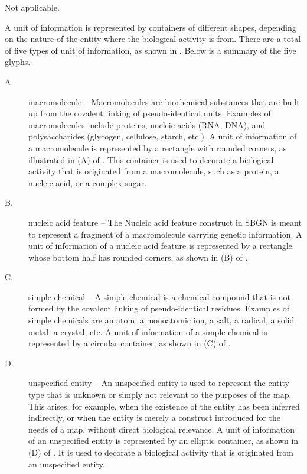 \begin{glyphDescription}

\glyphSboTerm Not applicable.

\glyphContainer A unit of information is represented by containers of different shapes, depending on the nature of the entity where the biological activity is from. There are a total of five types of unit of information, as shown in .   Below is a summary of the five glyphs.

\begin{description}
\item[A.] macromolecule -- Macromolecules are biochemical substances that are built up from the covalent linking of pseudo-identical units. Examples of macromolecules include proteins, nucleic acids (RNA, DNA), and polysaccharides (glycogen, cellulose, starch, etc.).  
A unit of information of a macromolecule is represented by a rectangle with rounded corners, as illustrated in (A) of .  This container is used to decorate a biological activity that is originated from a macromolecule, such as a protein, a nucleic acid, or a complex sugar.

\item[B.] nucleic acid feature -- The Nucleic acid feature construct in SBGN is meant to represent a fragment of a macromolecule carrying genetic information. A unit of information of a nucleic acid feature is represented by a rectangle whose bottom half has rounded corners, as shown in (B) of  .

\item[C.] simple chemical -- A simple chemical is a chemical compound that is not formed by the covalent linking of pseudo-identical residues. Examples of simple chemicals are an atom, a monoatomic ion, a salt, a radical, a solid metal, a crystal, etc. 
A unit of information of a simple chemical is represented by a circular container, as shown in (C) of .

\item[D.] unspecified entity -- An unspecified entity is used to represent the entity type that is unknown or simply not relevant to the purposes of the map. This arises, for example, when the existence of the entity has been inferred indirectly, or when the entity is merely a construct introduced for the needs of a map, without direct biological relevance. A unit of information of an unspecified entity is represented by an elliptic container, as shown in (D) of .  It is used to decorate a biological activity that is originated from an unspecified entity.


\end{description}
\end{glyphDescription}
